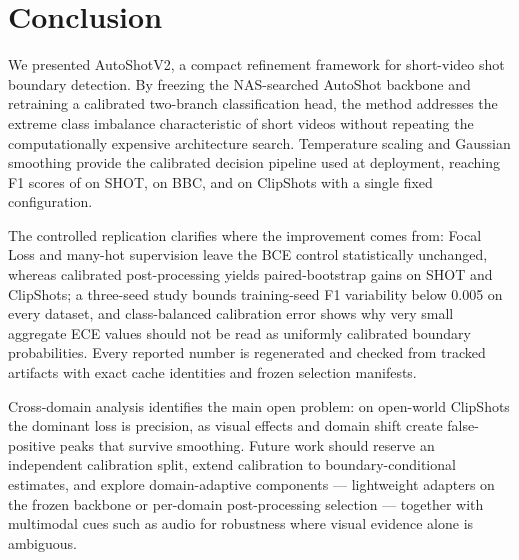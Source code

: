 \section{Conclusion}

We presented AutoShotV2, a compact refinement framework for short-video shot
boundary detection. By freezing the NAS-searched AutoShot backbone and
retraining a calibrated two-branch classification head, the method addresses
the extreme class imbalance characteristic of short videos without repeating
the computationally expensive architecture search. Temperature scaling and
Gaussian smoothing provide the calibrated decision pipeline used at
deployment, reaching F1 scores of \PaperDeployShotFOne{} on SHOT,
\PaperDeployBBCFOne{} on BBC, and \PaperDeployClipFOne{} on ClipShots with a
single fixed configuration.

The controlled replication clarifies where the improvement comes from:
Focal Loss and many-hot supervision leave the BCE control statistically
unchanged, whereas calibrated post-processing yields paired-bootstrap gains
on SHOT and ClipShots; a three-seed study bounds training-seed F1
variability below 0.005 on every dataset, and class-balanced calibration
error shows why very small aggregate ECE values should not be read as
uniformly calibrated boundary probabilities. Every reported number is
regenerated and checked from tracked artifacts with exact cache identities
and frozen selection manifests.

Cross-domain analysis identifies the main open problem: on open-world
ClipShots the dominant loss is precision, as visual effects and domain shift
create false-positive peaks that survive smoothing. Future work should
reserve an independent calibration split, extend calibration to
boundary-conditional estimates, and explore domain-adaptive components ---
lightweight adapters on the frozen backbone or per-domain post-processing
selection --- together with multimodal cues such as audio for robustness
where visual evidence alone is ambiguous.
